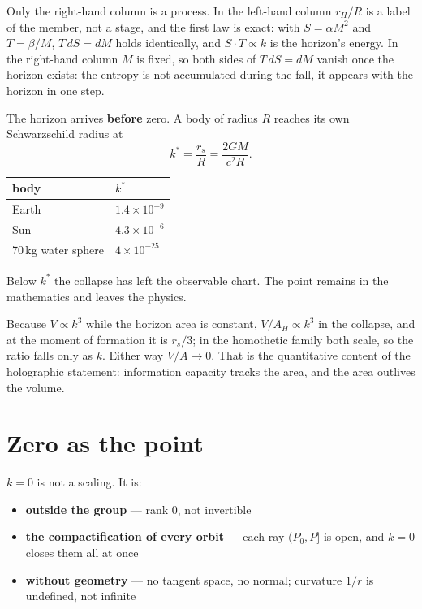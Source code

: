 \documentclass[11pt,fleqn]{article}
\begin{document}
Only the right-hand column is a process. In the left-hand column $r_H/R$ is a label of the member,
not a stage, and the first law is exact: with $S = \alpha M^2$ and $T = \beta/M$, $T\,dS = dM$
holds identically, and $S \cdot T \propto k$ is the horizon's energy. In the right-hand column $M$
is fixed, so both sides of $T\,dS = dM$ vanish once the horizon exists: the entropy is not
accumulated during the fall, it appears with the horizon in one step.

The horizon arrives \textbf{before} zero. A body of radius $R$ reaches its own Schwarzschild radius
at
\begin{equation}
k^{*} = \frac{r_s}{R} = \frac{2GM}{c^2R}.
\end{equation}

\begin{table}[H]
\centering
\begin{tabular}{@{}ll@{}}
\toprule
body & $k^{*}$ \\
\midrule
Earth & $1.4 \times 10^{-9}$ \\
Sun & $4.3 \times 10^{-6}$ \\
70\,kg water sphere & $4 \times 10^{-25}$ \\
\bottomrule
\end{tabular}
\end{table}

Below $k^{*}$ the collapse has left the observable chart. The point remains in the mathematics and
leaves the physics.

Because $V \propto k^3$ while the horizon area is constant, $V/A_H \propto k^3$ in the collapse,
and at the moment of formation it is $r_s/3$; in the homothetic family both scale, so the ratio
falls only as $k$. Either way $V/A \to 0$. That is the quantitative content of the holographic
statement: information capacity tracks the area, and the area outlives the volume.

\section{Zero as the point}

$k = 0$ is not a scaling. It is:

\begin{itemize}
\item \textbf{outside the group} --- rank $0$, not invertible
\item \textbf{the compactification of every orbit} --- each ray $(P_0, P]$ is open, and $k = 0$
closes them all at once
\item \textbf{without geometry} --- no tangent space, no normal; curvature $1/r$ is undefined, not
infinite
\end{itemize}
\end{document}
